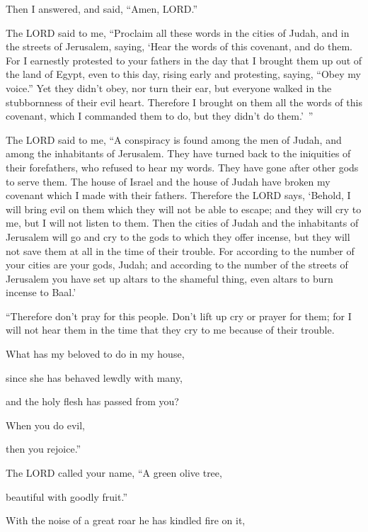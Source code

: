 Then I answered, and said, “Amen, LORD.”


\myverse{}The LORD said to me, “Proclaim all these words in the cities of Judah, and in the streets of Jerusalem, saying, ‘Hear the words of this covenant, and do them. \myverse{}For I earnestly protested to your fathers in the day that I brought them up out of the land of Egypt, even to this day, rising early and protesting, saying, “Obey my voice.” \myverse{}Yet they didn’t obey, nor turn their ear, but everyone walked in the stubbornness of their evil heart. Therefore I brought on them all the words of this covenant, which I commanded them to do, but they didn’t do them.’ ”


\myverse{}The LORD said to me, “A conspiracy is found among the men of Judah, and among the inhabitants of Jerusalem. \myverse{}They have turned back to the iniquities of their forefathers, who refused to hear my words. They have gone after other gods to serve them. The house of Israel and the house of Judah have broken my covenant which I made with their fathers. \myverse{}Therefore the LORD says, ‘Behold, I will bring evil on them which they will not be able to escape; and they will cry to me, but I will not listen to them. \myverse{}Then the cities of Judah and the inhabitants of Jerusalem will go and cry to the gods to which they offer incense, but they will not save them at all in the time of their trouble. \myverse{}For according to the number of your cities are your gods, Judah; and according to the number of the streets of Jerusalem you have set up altars to the shameful thing, even altars to burn incense to Baal.’


\myverse{}“Therefore don’t pray for this people. Don’t lift up cry or
prayer for them; for I will not hear them in the time that they cry to me because of their trouble.

\myverse{}What has my beloved to do in my house, 

since she has behaved lewdly with many, 

and the holy flesh has passed from you? 

When you do evil, 

then you rejoice.”


\vspace{\baselineskip}

\myverse{}The LORD called your name, “A green olive tree,

beautiful with goodly fruit.”

With the noise of a great roar he has kindled fire on it,

